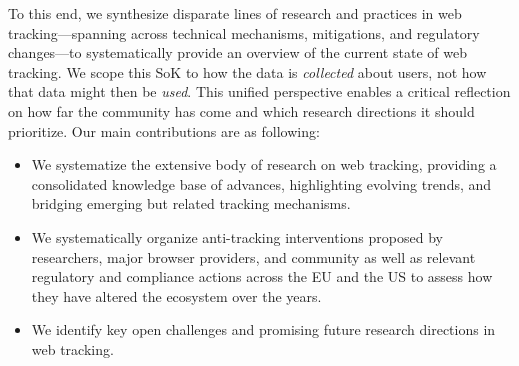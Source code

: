 To this end, we synthesize disparate lines of research and practices in web tracking---spanning across technical mechanisms, mitigations, and regulatory changes---to systematically provide an overview of the current state of web tracking.
%
We scope this SoK to how the data is \textit{collected} about users, not how that data might then be \textit{used}.
%
This unified perspective enables a critical reflection on how far the community has come and which research directions it should prioritize.
%
Our main contributions are as following:
%
\begin{itemize}
    \item We systematize the extensive body of research on web tracking, providing a consolidated knowledge base of advances, highlighting evolving trends, and bridging emerging but related tracking mechanisms.
    \item We systematically organize anti-tracking interventions proposed by researchers, major browser providers, and community as well as relevant regulatory and compliance actions across the EU and the US to assess how they have altered the ecosystem over the years.
    \item We identify key open challenges and promising future research directions in web tracking.
\end{itemize}
